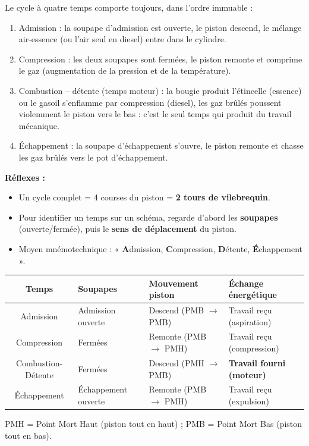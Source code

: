 \documentclass[11pt]{article}
\newcommand{\cle}[1]{{\popxbold\color{popdark}#1}}
\newcounter{popsec}
\newcounter{popsub}
\newcommand{\courssub}[1]{%
  \stepcounter{popsub}%
  \par\vspace{9pt}\noindent{\popxbold\fontsize{11.5}{13}\selectfont\color{popink}{\color{poporange}\thepopsec.\thepopsub}\hspace{6pt}#1}\par\nopagebreak\vspace{4pt}
}
\begin{document}
\courssub{Le cycle à quatre temps}

\begin{methode}
Le cycle à quatre temps comporte toujours, dans l'ordre immuable :
\begin{enumerate}
\item \cle{Admission} : la soupape d'admission est ouverte, le piston descend, le mélange air-essence (ou l'air seul en diesel) entre dans le cylindre.
\item \cle{Compression} : les deux soupapes sont fermées, le piston remonte et comprime le gaz (augmentation de la pression et de la température).
\item \cle{Combustion -- détente} (temps moteur) : la bougie produit l'étincelle (essence) ou le gasoil s'enflamme par compression (diesel), les gaz brûlés poussent violemment le piston vers le bas : c'est le seul temps qui produit du travail mécanique.
\item \cle{Échappement} : la soupape d'échappement s'ouvre, le piston remonte et chasse les gaz brûlés vers le pot d'échappement.
\end{enumerate}
\textbf{Réflexes :}
\begin{itemize}
\item Un cycle complet = 4 courses du piston = \textbf{2 tours de vilebrequin}.
\item Pour identifier un temps sur un schéma, regarde d'abord les \textbf{soupapes} (ouverte/fermée), puis le \textbf{sens de déplacement} du piston.
\item Moyen mnémotechnique : « \textbf{A}dmission, \textbf{C}ompression, \textbf{D}étente, \textbf{É}chappement ».
\end{itemize}
\end{methode}

\begin{propriete}
\begin{center}
\begin{tabularx}{\linewidth}{|c|X|X|X|}\hline
\rowcolor{popblueL}
\textbf{Temps} & \textbf{Soupapes} & \textbf{Mouvement piston} & \textbf{Échange énergétique} \\ \hline
Admission & Admission ouverte & Descend (PMB $\rightarrow$ PMB) & Travail reçu (aspiration) \\ \hline
Compression & Fermées & Remonte (PMB $\rightarrow$ PMH) & Travail reçu (compression) \\ \hline
Combustion-Détente & Fermées & Descend (PMH $\rightarrow$ PMB) & \textbf{Travail fourni (moteur)} \\ \hline
Échappement & Échappement ouverte & Remonte (PMB $\rightarrow$ PMH) & Travail reçu (expulsion) \\ \hline
\end{tabularx}
\end{center}
PMH = Point Mort Haut (piston tout en haut) ; PMB = Point Mort Bas (piston tout en bas).
\end{propriete}
\end{document}
